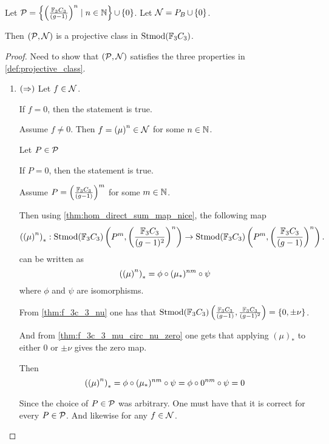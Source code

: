 \begin{theorem} %
    Let \( {\mathcal{P}} = \left\{ \left( \frac{{\mathbb{F}}_3C_3}{(g - 1)} \right)^n \mid n \in {\mathbb{N}} \right\} \mathop{\cup}\limits \left\{ 0 \right\} \). Let \( {\mathcal{N}} = P_B \mathop{\cup}\limits \left\{ 0 \right\} \).

    Then \( \left( {\mathcal{P}}, {\mathcal{N}}\right) \) is a projective class in \( \operatorname{Stmod}({\mathbb{F}}_3C_3) \).
\end{theorem}
\begin{proof}
    Need to show that \( \left( {\mathcal{P}}, {\mathcal{N}} \right) \) satisfies the three properties in \autoref{def:projective_class}.

    \begin{enumerate}
        \item {
            \( \left( \Rightarrow \right) \) Let \( f \in {\mathcal{N}} \).

            If \( f = 0 \), then the statement is true.

            Assume \( f \neq 0 \). Then \( f = \left( \mu \right)^n \in {\mathcal{N}} \) for some \( n \in {\mathbb{N}} \).
            
            Let \( P \in {\mathcal{P}} \)
            
            If \( P = 0 \), then the statement is true.

            Assume \( P = \left( \frac{{\mathbb{F}}_3C_3}{(g - 1)} \right)^m \) for some \( m \in {\mathbb{N}} \).

            Then using \autoref{thm:hom_direct_sum_map_nice}, the following map
            \[
                \left( \left( \mu \right)^n \right)_* : \operatorname{Stmod}({\mathbb{F}}_3C_3)\left(P^m, \left(\frac{{\mathbb{F}}_3C_3}{(g - 1)^2}\right)^n \right) \to \operatorname{Stmod}({\mathbb{F}}_3C_3)\left(P^m, \left(\frac{{\mathbb{F}}_3C_3}{(g - 1)}\right)^n \right).
            \]
            can be written as
            \[
                \left( \left( \mu \right)^n \right)_* = \phi \circ (\mu_*)^{nm} \circ \psi
            \]
            where \( \phi \) and \( \psi \) are isomorphisms.

            From \autoref{thm:f_3c_3_nu} one has that \( \operatorname{Stmod}({\mathbb{F}}_3C_3)\left( \frac{{\mathbb{F}}_3C_3}{(g - 1)}, \frac{{\mathbb{F}}_3C_3}{(g - 1)^2} \right) = \left\{ 0, \pm \nu \right\} \).

            And from \autoref{thm:f_3c_3_mu_circ_nu_zero} one gets that applying \( (\mu)_* \) to either \( 0 \) or \( \pm \nu \) gives the zero map.

            Then
            \[
                \left( \left( \mu \right)^n \right)_* = \phi \circ (\mu_*)^{nm} \circ \psi = \phi \circ 0^{nm} \circ \psi = 0
            \]

            Since the choice of \( P \in {\mathcal{P}} \) was arbitrary. One must have that it is correct for every \( P \in {\mathcal{P}} \). And likewise for any \( f \in {\mathcal{N}} \).

}
\end{enumerate}
\end{proof}
